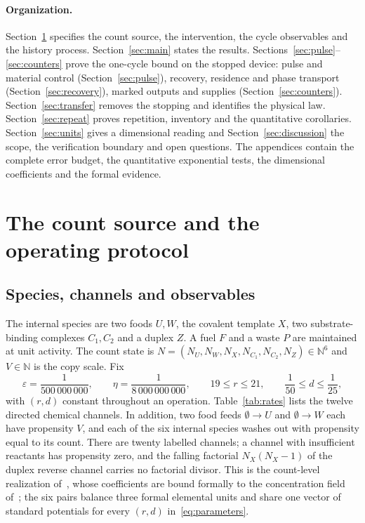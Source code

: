 \documentclass[11pt,a4paper]{article}
\theoremstyle{plain}
\theoremstyle{definition}
\theoremstyle{remark}
\newcommand{\N}{\mathbb N}
\newcommand{\eps}{\varepsilon}
\begin{document}
\paragraph{Organization.}
Section~\ref{sec:model} specifies the count source, the intervention, the cycle observables and the history process. Section~\ref{sec:main} states the results. Sections~\ref{sec:pulse}--\ref{sec:counters} prove the one-cycle bound on the stopped device: pulse and material control (Section~\ref{sec:pulse}), recovery, residence and phase transport (Section~\ref{sec:recovery}), marked outputs and supplies (Section~\ref{sec:counters}). Section~\ref{sec:transfer} removes the stopping and identifies the physical law. Section~\ref{sec:repeat} proves repetition, inventory and the quantitative corollaries. Section~\ref{sec:units} gives a dimensional reading and Section~\ref{sec:discussion} the scope, the verification boundary and open questions. The appendices contain the complete error budget, the quantitative exponential tests, the dimensional coefficients and the formal evidence.

\section{The count source and the operating protocol}\label{sec:model}

\subsection{Species, channels and observables}\label{sec:source}
The internal species are two foods $U,W$, the covalent template $X$, two substrate-binding complexes $C_1,C_2$ and a duplex $Z$. A fuel $F$ and a waste $P$ are maintained at unit activity. The count state is $N=(N_U,N_W,N_X,N_{C_1},N_{C_2},N_Z)\in\N^6$ and $V\in\N$ is the copy scale. Fix
\begin{equation}\label{eq:parameters}
\eps=\frac1{500\,000\,000},\qquad \eta=\frac1{8\,000\,000\,000},\qquad 19\le r\le21,\qquad \frac1{50}\le d\le\frac1{25},
\end{equation}
with $(r,d)$ constant throughout an operation. Table~\ref{tab:rates} lists the twelve directed chemical channels. In addition, two food feeds $\emptyset\to U$ and $\emptyset\to W$ each have propensity $V$, and each of the six internal species washes out with propensity equal to its count. There are twenty labelled channels; a channel with insufficient reactants has propensity zero, and the falling factorial $N_X(N_X-1)$ of the duplex reverse channel carries no factorial divisor. This is the count-level realization of~\citep{thermo2026}, whose coefficients are bound formally to the concentration field of~\citep{recovery2026}; the six pairs balance three formal elemental units and share one vector of standard potentials for every $(r,d)$ in~\eqref{eq:parameters}.
\end{document}
